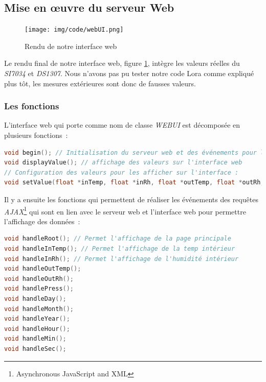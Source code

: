         \subsection{Mise en œuvre du serveur Web}

            \begin{figure}[!h]
                \begin{center}
                    \texttt{[image: img/code/webUI.png]}
                    \caption{\label{fig:WebUI}Rendu de notre interface web}  
                \end{center}
            \end{figure}

            Le rendu final de notre interface web, figure \ref{fig:WebUI}, intègre les valeurs réelles du \textit{SI7034} et \textit{DS1307}. Nous n’avons pas pu tester notre code Lora comme expliqué plus tôt, les mesures extérieures sont donc de fausses valeurs.\\


            \subsubsection{Les fonctions}

                \noindent
                L'interface web qui porte comme nom de classe \textit{WEBUI} est décomposée en plusieurs fonctions~:

\begin{lstlisting}[style=myC, caption=Fonctions publiques de WEBUI, language=C, frame=lines]
void begin(); // Initialisation du serveur web et des événements pour les requettes AJAX
void displayValue(); // affichage des valeurs sur l'interface web
// Configuration des valeurs pour les afficher sur l'interface :
void setValue(float *inTemp, float *inRh, float *outTemp, float *outRh, long *Press, struct MyTime *myTm);
\end{lstlisting}

                \vspace{.5 cm}

                \noindent
                Il y a ensuite les fonctions qui permettent de réaliser les événements des requêtes \textit{AJAX}\footnote{Asynchronous JavaScript and XML} qui sont en lien avec le serveur web et l'interface web pour permettre l'affichage des données~:

\begin{lstlisting}[style=myC, caption=Fonctions pour les évenements, language=C, frame=lines]
void handleRoot(); // Permet l'affichage de la page principale
void handleInTemp(); // Permet l'affichage de la temp intérieur
void handleInRh(); // Permet l'affichage de l'humidité intérieur
void handleOutTemp();
void handleOutRh();
void handlePress();
void handleDay();
void handleMonth();
void handleYear();
void handleHour();
void handleMin();
void handleSec();
\end{lstlisting}


